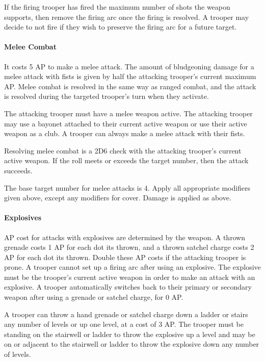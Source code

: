 If the firing trooper has fired the maximum number of shots the weapon supports, then remove the firing arc once the firing is resolved.
A trooper may decide to not fire if they wish to preserve the firing arc for a future target.

\paragraph*{Melee Combat}

It costs 5 AP to make a melee attack.
The amount of bludgeoning damage for a melee attack with fists is given by half the attacking trooper's current maximum AP.
Melee combat is resolved in the same way as ranged combat, and the attack is resolved during the targeted trooper's turn when they activate.

The attacking trooper must have a melee weapon active.
The attacking trooper may use a bayonet attached to their current active weapon or use their active weapon as a club.
A trooper can always make a melee attack with their fists.

Resolving melee combat is a 2D6 check with the attacking trooper's current active weapon.
If the roll meets or exceeds the target number, then the attack succeeds.

The base target number for melee attacks is 4.
Apply all appropriate modifiers given above, except any modifiers for cover.
Damage is applied as above.

\paragraph*{Explosives}

AP cost for attacks with explosives are determined by the weapon.
A thrown grenade costs 1 AP for each dot its thrown, and a thrown satchel charge costs 2 AP for each dot its thrown.
Double these AP costs if the attacking trooper is prone.
A trooper cannot set up a firing arc after using an explosive.
The explosive must be the trooper's current active weapon in order to make an attack with an explosive.
A trooper automatically switches back to their primary or secondary weapon after using a grenade or satchel charge, for 0 AP.

A trooper can throw a hand grenade or satchel charge down a ladder or stairs any number of levels or up one level, at a cost of 3 AP.
The trooper must be standing on the stairwell or ladder to throw the explosive up a level and may be on or adjacent to the stairwell or ladder to throw the explosive down any number of levels.

